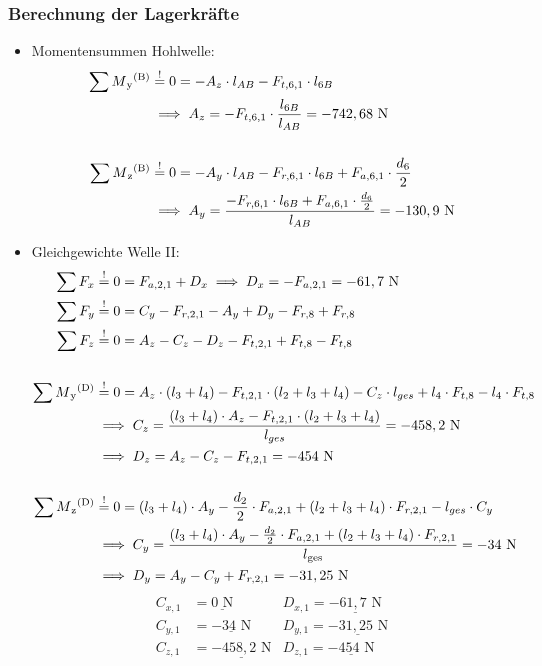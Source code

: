 \subsubsection{Berechnung der Lagerkräfte}
\begin{itemize}
\item Momentensummen Hohlwelle:
\begin{align*}
	\sum M\textsubscript{y}\textsuperscript{(B)} &\overset{!}{=} 0 = -A_z \cdot l_{AB} - F_{t,6,1} \cdot l_{6B} \\
	&\implies A_z = -F_{t,6,1} \cdot \frac{l_{6B}}{l_{AB}} = -742,68 \text{ N} \\ \\
	\sum M\textsubscript{z}\textsuperscript{(B)} &\overset{!}{=} 0 = -A_y \cdot l_{AB} - F_{r,6,1} \cdot l_{6B} + F_{a,6,1} \cdot \frac{d_6}{2}\\
	&\implies A_y = \frac{-F_{r,6,1} \cdot l_{6B} + F_{a,6,1} \cdot \frac{d_6}{2}} {l_{AB}}= -130,9 \text{ N} 
\end{align*}
\item Gleichgewichte Welle II:
\begin{align*}
	\sum F_x &\overset{!}{=} 0 = F_{a,2,1} + D_x \implies D_x = -F_{a,2,1} = -61,7 \text{ N} \\
	\sum F_y &\overset{!}{=} 0 = C_y - F_{r,2,1}-A_y +D_y - F_{r,8} + F_{r,8}\\ 
	\sum F_z &\overset{!}{=} 0 = A_z - C_z - D_z - F_{t,2,1} + F_{t,8} - F_{t,8}\\ \\
	\sum M\textsubscript{y}\textsuperscript{(D)} &\overset{!}{=} 0 = A_z \cdot (l_3+l_4)- F_{t,2,1} \cdot (l_2+l_3+l_4) - C_z \cdot l_{ges} +l_4 \cdot F_{t,8}- l_4 \cdot F_{t,8} \\ 
	&\implies C_z = \frac{(l_3+l_4) \cdot A_z - F_{t,2,1} \cdot (l_2+l_3+l_4)}{l_{ges}} = -458,2 \text { N} \\ 
	& \implies D_z = A_z - C_z - F_{t,2,1}= -454 \text{ N}\\ \\
	\sum M\textsubscript{z}\textsuperscript{(D)} &\overset{!}{=} 0 = (l_3+l_4) \cdot A_y - \frac{d_2}{2} \cdot F_{a,2,1} + (l_2+l_3+l_4) \cdot F_{r,2,1}- l_{ges} \cdot C_y  \\ 
	&\implies C_y = \frac{(l_3+l_4) \cdot A_y - \frac{d_2}{2} \cdot F_{a,2,1} + (l_2+l_3+l_4) \cdot F_{r,2,1}}{l\textsubscript{ges}} = -34 \text{ N}\\ 
	& \implies D_y =   A_y - C_y + F_{r,2,1} = -31,25\text{ N}
\end{align*}
\begin{align*}
	C_{x,1} &= \underline{0\text{ N}} & D_{x,1}= \underline{-61,7\text{ N}}\\
	C_{y,1} &= \underline{-34\text{ N}} & D_{y,1}= \underline{-31,25\text{ N}}\\
	C_{z,1} &= \underline{-458,2\text{ N}} & D_{z,1}= \underline{-454\text{ N}}
\end{align*}
\end{itemize}
